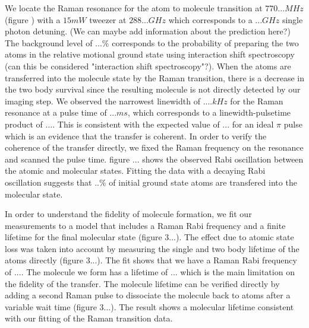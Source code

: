 \documentclass[aps,prl,twocolumn,groupedaddress]{revtex4-1}
\newcommand{\todo}[1]{}
\begin{document}

We locate the Raman resonance for the atom to molecule transition at $770... MHz$ (figure \todo{}) with a $15 mW$ tweezer at $288... GHz$ which corresponds to a $... GHz$ single photon detuning. (We can maybe add information about the prediction here?)
The background level of $...\%$ corresponds to the probability of preparing the two atoms in the relative motional ground state using interaction shift spectroscopy (can this be considered "interaction shift spectroscopy"?). When the atoms are transferred into the molecule state by the Raman transition, there is a decrease in the two body survival since the resulting molecule is not directly detected by our imaging step.
We observed the narrowest linewidth of $.... kHz$ for the Raman resonance at a pulse time of $... ms$, which corresponds to a linewidth-pulsetime product of $...$. This is consistent with the expected value of $...$ for an ideal $\pi$ pulse which is an evidence that the transfer is coherent. In order to verify the coherence of the transfer directly, we fixed the Raman frequency on the resonance and scanned the pulse time. figure ... shows the observed Rabi oscillation between the atomic and molecular states. Fitting the data with a decaying Rabi oscillation suggests that $..\%$ of initial ground state atoms are transfered into the molecular state.

In order to understand the fidelity of molecule formation, we fit our measurements to a model that includes a Raman Rabi frequency and a finite lifetime for the final molecular state (figure 3...). The effect due to atomic state loss was taken into account by measuring the single and two body lifetime of the atoms directly (figure 3...). The fit shows that we have a Raman Rabi frequency of $...$. The molecule we form has a lifetime of $...$ which is the main limitation on the fidelity of the transfer. The molecule lifetime can be verified directly by adding a second Raman pulse to dissociate the molecule back to atoms after a variable wait time (figure 3...). The result shows a molecular lifetime consistent with our fitting of the Raman transition data.
\end{document}
